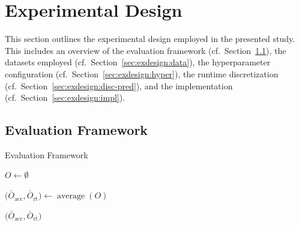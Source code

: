 \documentclass[sn-basic, Numbered]{sn-jnl} %
\begin{document}
\section{Experimental Design}
\label{sec:exdesign}

This section outlines the experimental design employed in the presented study.
This includes an overview of the evaluation framework (cf.~Section~\ref{sec:exdesign:eval}), the datasets employed (cf.~Section~\ref{sec:exdesign:data}), the hyperparameter configuration (cf.~Section~\ref{sec:exdesign:hyper}), the runtime discretization (cf.~Section~\ref{sec:exdesign:disc-pred}), and the implementation (cf.~Section~\ref{sec:exdesign:impl}).

\subsection{Evaluation Framework}
\label{sec:exdesign:eval}

\begin{algorithm}[tb]
  \caption{Evaluation Framework}
  \label{alg:eval}

  \BlankLine

  $O \leftarrow \emptyset$


  $\bigl( \bar{O}_{\operatorname{acc}}, \bar{O}_{\operatorname{rt}} \bigr) \leftarrow \operatorname{average}(O)$ \;
  
  \Return $\bigl( \bar{O}_{\operatorname{acc}}, \bar{O}_{\operatorname{rt}} \bigr)$
\end{algorithm}
\end{document}
